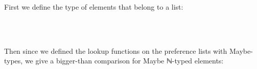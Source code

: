 {First we define the type of elements that belong to a list:

\begin{code}%
\>[0]\AgdaSpace{}%
\AgdaSpace{}%
\AgdaSymbol{\{}\AgdaSpace{}%
\AgdaSymbol{:}\AgdaSpace{}%
\AgdaSymbol{\}(}\AgdaSpace{}%
\AgdaSymbol{:}\AgdaSpace{}%
\AgdaSymbol{)}\AgdaSpace{}%
\AgdaSymbol{:}\AgdaSpace{}%
\AgdaSpace{}%
\AgdaSpace{}%
\AgdaSpace{}%
\AgdaSpace{}%
\<%
\\
\>[0][@{}l@{\AgdaIndent{0}}]%
\>[2]%
\>[8]\AgdaSymbol{:}\AgdaSpace{}%
\AgdaSymbol{(}\AgdaSpace{}%
\AgdaSymbol{:}\AgdaSpace{}%
\AgdaSpace{}%
\AgdaSymbol{)}\AgdaSpace{}%
\AgdaSpace{}%
\AgdaSpace{}%
\AgdaSpace{}%
\AgdaSymbol{(}\AgdaSpace{}%
\AgdaSpace{}%
\AgdaSymbol{)}\<%
\\
%
\>[2]\AgdaSpace{}%
\AgdaSymbol{:}\AgdaSpace{}%
\AgdaSymbol{\{}\AgdaSpace{}%
\AgdaSymbol{:}\AgdaSpace{}%
\AgdaSymbol{\}\{}\AgdaSpace{}%
\AgdaSymbol{:}\AgdaSpace{}%
\AgdaSpace{}%
\AgdaSymbol{\}}\AgdaSpace{}%
\AgdaSpace{}%
\AgdaSpace{}%
\AgdaSpace{}%
\AgdaSpace{}%
\AgdaSpace{}%
\AgdaSpace{}%
\AgdaSpace{}%
\AgdaSymbol{(}\AgdaSpace{}%
\AgdaSpace{}%
\AgdaSymbol{)}\<%
\end{code}

Then since we defined the lookup functions on the preference lists with Maybe-types, we give a bigger-than comparison for Maybe ℕ-typed elements:

\begin{code}%
\>[0]\AgdaSpace{}%
\AgdaSpace{}%
\AgdaSymbol{:}\AgdaSpace{}%
\AgdaSpace{}%
\AgdaSpace{}%
\AgdaSpace{}%
\AgdaSpace{}%
\AgdaSpace{}%
\AgdaSpace{}%
\AgdaSpace{}%
\<%
\\
\>[0][@{}l@{\AgdaIndent{0}}]%
\>[2]\AgdaSpace{}%
\AgdaSymbol{:}\AgdaSpace{}%
\AgdaSymbol{\{}\AgdaSpace{}%
\AgdaSpace{}%
\AgdaSymbol{:}\AgdaSpace{}%
\AgdaSymbol{\}}\AgdaSpace{}%
\AgdaSpace{}%
\AgdaSpace{}%
\AgdaOperator{\AgdaFunction{>}}\AgdaSpace{}%
\AgdaSpace{}%
\AgdaSpace{}%
\AgdaSpace{}%
\AgdaSpace{}%
\AgdaSpace{}%
\AgdaSpace{}%
\<%
\end{code}

}
